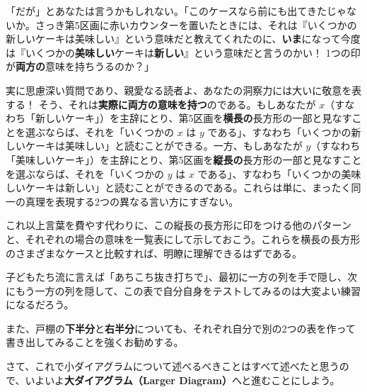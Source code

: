 \documentclass[a4paper,11pt,openany]{ltjsbook}
\begin{document}
「だが」とあなたは言うかもしれない。「このケースなら前にも出てきたじゃないか。さっき第5区画に赤いカウンターを置いたときには、それは『いくつかの新しいケーキは美味しい』という意味だと教えてくれたのに、\textbf{いま}になって今度は『いくつかの\textbf{美味しい}ケーキは\textbf{新しい}』という意味だと言うのかい！ 1つの印が\textbf{両方の}意味を持ちうるのか？」

実に思慮深い質問であり、親愛なる読者よ、あなたの洞察力には大いに敬意を表する！ そう、それは\textbf{実際に両方の意味を持つ}のである。もしあなたが $x$（すなわち「新しいケーキ」）を主辞にとり、第5区画を\textbf{横長の}長方形の一部と見なすことを選ぶならば、それを「いくつかの $x$ は $y$ である」、すなわち「いくつかの新しいケーキは美味しい」と読むことができる。一方、もしあなたが $y$（すなわち「美味しいケーキ」）を主辞にとり、第5区画を\textbf{縦長の}長方形の一部と見なすことを選ぶならば、それを「いくつかの $y$ は $x$ である」、すなわち「いくつかの美味しいケーキは新しい」と読むことができるのである。これらは単に、まったく同一の真理を表現する2つの異なる言い方にすぎない。

これ以上言葉を費やす代わりに、この縦長の長方形に印をつける他のパターンと、それぞれの場合の意味を一覧表にして示しておこう。これらを横長の長方形のさまざまなケースと比較すれば、明瞭に理解できるはずである。

子どもたち流に言えば「あちこち抜き打ちで」、最初に一方の列を手で隠し、次にもう一方の列を隠して、この表で自分自身をテストしてみるのは大変よい練習になるだろう。

また、戸棚の\textbf{下半分}と\textbf{右半分}についても、それぞれ自分で別の2つの表を作って書き出してみることを強くお勧めする。

さて、これで小ダイアグラムについて述べるべきことはすべて述べたと思うので、いよいよ\textbf{大ダイアグラム（Larger Diagram）}へと進むことにしよう。
\end{document}
